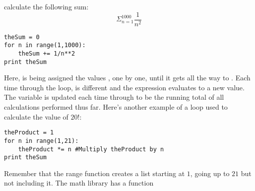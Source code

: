 calculate the following sum:
\begin{equation}
\Sigma_{n=1}^{1000} \frac{1}{n^2}
\end{equation}
\begin{Verbatim}
theSum = 0
for n in range(1,1000):
    theSum += 1/n**2
print theSum
\end{Verbatim}
Here,  is being assigned the values
, one by one, until it gets all the way to
.  Each time through the loop,  is different
and the expression  evaluates to a new value.  The
variable  is updated each time through to be the
running total of all calculations performed thus far.  Here's another
example of a loop used to calculate the value of $20!$:
\begin{Verbatim}
theProduct = 1
for n in range(1,21):
    theProduct *= n #Multiply theProduct by n
print theSum
\end{Verbatim}
Remember that the range function creates a list starting at $1$, going
up to $21$ but not including it. The math library has a function
